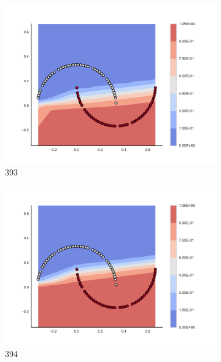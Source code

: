 \begin{figure}[h]
\begin{subfigure}[b]{0.09\textwidth}
    \includegraphics[clip, trim=2.35cm 1.75cm 4.5cm 0cm,width=\textwidth]{img/convergence/393.pdf}
    \caption{393}
    \label{fig:convergence_393}
\end{subfigure}
%
\begin{subfigure}[b]{0.09\textwidth}
    \includegraphics[clip, trim=2.35cm 1.75cm 4.5cm 0cm,width=\textwidth]{img/convergence/394.pdf}
    \caption{394}
    \label{fig:convergence_394}
\end{subfigure}
%
\begin{subfigure}[b]{0.09\textwidth}

\end{subfigure}
\end{figure}
